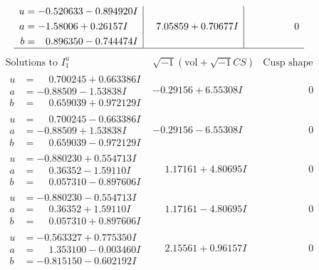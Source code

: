 \documentclass[1p]{elsarticle_modified}
\theoremstyle{definition}
\newcommand{\I}{\sqrt{-1}}
\begin{document}
$$\begin{array}{c|c|c}
\begin{aligned}
u &= -0.520633 - 0.894920 I \\
a &= -1.58006 + 0.26157 I \\
b &= \phantom{-}0.896350 - 0.744474 I\end{aligned}
 & \phantom{-}7.05859 + 0.70677 I & \phantom{-0.000000 } 0\\
 \hline 
 \end{array}$$\newpage$$\begin{array}{c|c|c}  
\text{Solutions to }I^u_{1}& \I (\text{vol} + \sqrt{-1}CS) & \text{Cusp shape}\\
 \hline 
\begin{aligned}
u &= \phantom{-}0.700245 + 0.663386 I \\
a &= -0.88509 - 1.53838 I \\
b &= \phantom{-}0.659039 + 0.972129 I\end{aligned}
 & -0.29156 + 6.55308 I & \phantom{-0.000000 } 0 \\ \hline\begin{aligned}
u &= \phantom{-}0.700245 - 0.663386 I \\
a &= -0.88509 + 1.53838 I \\
b &= \phantom{-}0.659039 - 0.972129 I\end{aligned}
 & -0.29156 - 6.55308 I & \phantom{-0.000000 } 0 \\ \hline\begin{aligned}
u &= -0.880230 + 0.554713 I \\
a &= \phantom{-}0.36352 - 1.59110 I \\
b &= \phantom{-}0.057310 - 0.897606 I\end{aligned}
 & \phantom{-}1.17161 + 4.80695 I & \phantom{-0.000000 } 0 \\ \hline\begin{aligned}
u &= -0.880230 - 0.554713 I \\
a &= \phantom{-}0.36352 + 1.59110 I \\
b &= \phantom{-}0.057310 + 0.897606 I\end{aligned}
 & \phantom{-}1.17161 - 4.80695 I & \phantom{-0.000000 } 0 \\ \hline\begin{aligned}
u &= -0.563327 + 0.775350 I \\
a &= \phantom{-}1.353100 - 0.003460 I \\
b &= -0.815150 - 0.602192 I\end{aligned}
 & \phantom{-}2.15561 + 0.96157 I & \phantom{-0.000000 } 0 \\ \hline\begin{aligned}

\end{aligned}
\end{array}$$
\end{document}

